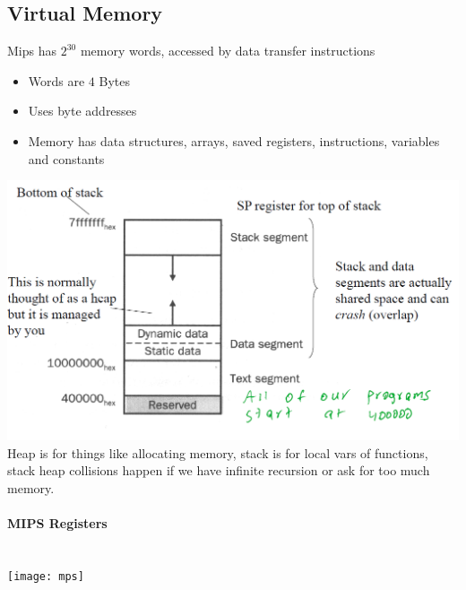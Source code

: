 \documentclass[12 pt]{article}
\begin{document}
\subsection{Virtual Memory} Mips has $2^{30}$ memory words, accessed by data transfer instructions
\begin{itemize}
\item Words are $4$ Bytes
\item Uses byte addresses
\item Memory has data structures, arrays, saved registers, instructions, variables and constants
\end{itemize}
\includegraphics[scale=0.7]{vms}
\\ Heap is for things like allocating memory, stack is for local vars of functions, stack heap collisions happen if we have infinite recursion or ask for too much memory.
\paragraph{MIPS Registers}~\\ \texttt{[image: mps]}
\end{document}
